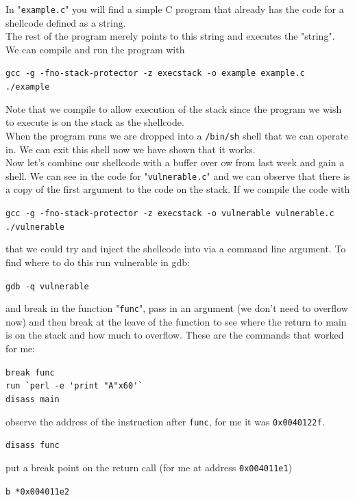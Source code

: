 \documentclass{article}
\begin{document}
\noindent In "\lstinline{example.c}" you will find a simple C program that already has the
code for a shellcode defined as a string.\\

\noindent The rest of the program merely
points to this string and executes the "string". We can compile and run the
program with
\begin{center}
    \lstinline{gcc -g -fno-stack-protector -z execstack -o example example.c}\\
    \lstinline{./example}
\end{center}
\noindent Note that we compile to allow execution of the stack since the program we wish to execute is on the stack as the shellcode.\\

\noindent When the program runs we are dropped into a \lstinline{/bin/sh} shell that we can
operate in. We can exit this shell now we have shown that it works.\\

\noindent Now let's combine our shellcode with a buffer over
ow from last week and
gain a shell. We can see in the code for "\lstinline{vulnerable.c}" and we can observe
that there is a copy of the first argument to the code on the stack. If we
compile the code with
\begin{center}
    \lstinline{gcc -g -fno-stack-protector -z execstack -o vulnerable vulnerable.c}\\
    \lstinline{./vulnerable}
\end{center}
\noindent that we could try and inject the shellcode into via a command line argument. To find where to do this run vulnerable in gdb:
\begin{center}
    \lstinline{gdb -q vulnerable}
\end{center}
\noindent and break in the function "\lstinline{func}", pass in an argument (we don't need to overflow now) and then break at the leave of the function to see where the return to main is on the stack and how much to overflow. These are the commands that worked for me:
\begin{center}
    \lstinline{break func}\\
    \lstinline{run `perl -e 'print "A"x60'`}\\
    \lstinline{disass main}
\end{center}
\noindent observe the address of the instruction after \lstinline{func}, for me it was \lstinline{0x0040122f}.
\begin{center}
    \lstinline{disass func}
\end{center}
\noindent put a break point on the return call (for me at address \lstinline{0x004011e1})
\begin{center}
    \lstinline{b *0x004011e2}
\end{center}
\end{document}
